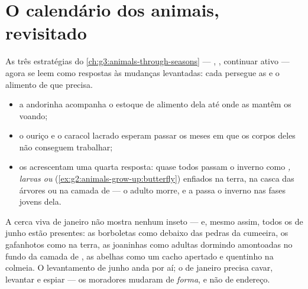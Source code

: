 \section{O calendário dos animais, revisitado}

\begin{proposition}\label{prop:g6:life-through-seasons:animals}
As três estratégias do \cref{ch:g3:animals-through-seasons} ---
, , continuar ativo --- agora se leem como respostas às
mudanças levantadas: cada  persegue as  e o alimento
de que precisa.
\begin{itemize}
  \item a andorinha acompanha o estoque de alimento dela até onde as
         mantêm os  voando;
  \item o ouriço e o caracol lacrado esperam passar os meses em que
        os corpos deles não conseguem trabalhar;
  \item os  acrescentam uma quarta resposta: quase todos
        passam o inverno como \emph{, larvas ou }
        (\cref{ex:g2:animals-grow-up:butterfly}) enfiados na terra,
        na casca das árvores ou na camada de  --- o adulto
        morre, e a  passa o inverno nas fases jovens dela.
\end{itemize}
\end{proposition}
\admitted

\begin{example}\label{ex:g6:life-through-seasons:insects}
A cerca viva de janeiro não mostra nenhum inseto --- e, mesmo assim,
todos os de junho estão presentes: as borboletas como 
debaixo das pedras da cumeeira, os gafanhotos como  na terra, as
joaninhas como adultas dormindo amontoadas no fundo da camada de
, as abelhas como um cacho apertado e quentinho na colmeia. O
levantamento de junho anda por aí; o de janeiro precisa cavar,
levantar e espiar --- os moradores mudaram de \emph{forma}, e não de
endereço.
\end{example}

